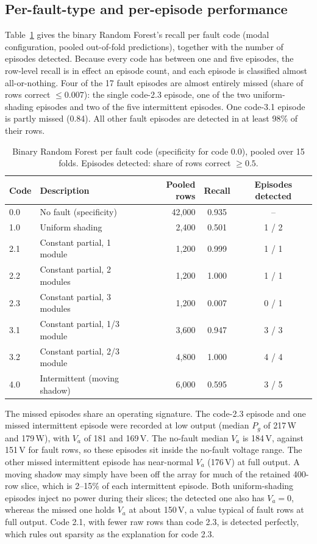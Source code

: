 \documentclass[11pt,a4paper]{article}
\begin{document}
\subsection{Per-fault-type and per-episode performance}
\label{sec:perfault}

Table~\ref{tab:perfault} gives the binary Random Forest's recall per fault code (modal configuration, pooled out-of-fold predictions), together with the number of episodes detected. Because every code has between one and five episodes, the row-level recall is in effect an episode count, and each episode is classified almost all-or-nothing. Four of the 17 fault episodes are almost entirely missed (share of rows correct $\leq 0.007$): the single code-2.3 episode, one of the two uniform-shading episodes and two of the five intermittent episodes. One code-3.1 episode is partly missed (0.84). All other fault episodes are detected in at least 98\% of their rows.

\begin{table}[t]
\centering
\caption{Binary Random Forest per fault code (specificity for code 0.0), pooled over 15 folds. Episodes detected: share of rows correct $\geq 0.5$.}
\label{tab:perfault}
\small
\begin{tabular}{@{}llrcc@{}}
\toprule
Code & Description & Pooled rows & Recall & Episodes detected \\
\midrule
0.0 & No fault (specificity) & 42{,}000 & 0.935 & -- \\
1.0 & Uniform shading & 2{,}400 & 0.501 & 1 / 2 \\
2.1 & Constant partial, 1 module & 1{,}200 & 0.999 & 1 / 1 \\
2.2 & Constant partial, 2 modules & 1{,}200 & 1.000 & 1 / 1 \\
2.3 & Constant partial, 3 modules & 1{,}200 & 0.007 & 0 / 1 \\
3.1 & Constant partial, 1/3 module & 3{,}600 & 0.947 & 3 / 3 \\
3.2 & Constant partial, 2/3 module & 4{,}800 & 1.000 & 4 / 4 \\
4.0 & Intermittent (moving shadow) & 6{,}000 & 0.595 & 3 / 5 \\
\bottomrule
\end{tabular}
\end{table}

The missed episodes share an operating signature. The code-2.3 episode and one missed intermittent episode were recorded at low output (median $P_g$ of 217\,W and 179\,W), with $V_a$ of 181 and 169\,V. The no-fault median $V_a$ is 184\,V, against 151\,V for fault rows, so these episodes sit inside the no-fault voltage range. The other missed intermittent episode has near-normal $V_a$ (176\,V) at full output. A moving shadow may simply have been off the array for much of the retained 400-row slice, which is 2--15\% of each intermittent episode. Both uniform-shading episodes inject no power during their slices; the detected one also has $V_a=0$, whereas the missed one holds $V_a$ at about 150\,V, a value typical of fault rows at full output. Code 2.1, with fewer raw rows than code 2.3, is detected perfectly, which rules out sparsity as the explanation for code 2.3.
\end{document}
